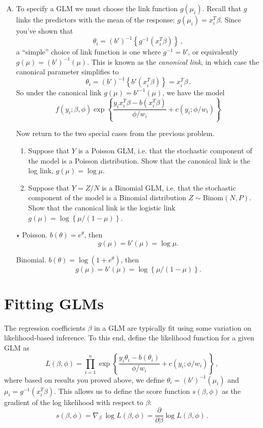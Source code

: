 \documentclass[11pt]{article}
\newcommand{\jie}{$\star$ }
\begin{document}
\begin{enumerate}[(A)]
\begin{enumerate}
\end{enumerate}




\item To specify a GLM we must choose the link function $g(\mu_i)$.  Recall that $g$ links the predictors with the mean of the response: $g(\mu_i) = x_i^T \beta$.  Since you've shown that
$$
\theta_i = (b')^{-1} \left\{g^{-1}(x_i^T \beta) \right\} \, ,
$$
a ``simple'' choice of link function is one where $g^{-1} = b'$, or equivalently $g(\mu) = (b')^{-1}(\mu)$.  This is known as the \textit{canonical link}, in which case the canonical parameter simplifies to
$$
\theta_i = (b')^{-1} \left\{b'(x_i^T \beta) \right\} = x_i^T \beta \, .
$$
So under the canonical link $g(\mu) = b'^{-1}(\mu)$, we have the model
$$
f(y_i; \beta, \phi) \exp \left\{ \frac{y_i x_i^T \beta - b(x_i^T \beta)}{\phi/w_i} + c(y_i; \phi/w_i)   \right \}
$$

Now return to the two special cases from the previous problem.
\begin{enumerate}[(1)]
\item Suppose that $Y$ is a Poisson GLM, i.e. that the stochastic component of the model is a Poisson distribution. Show that the canonical link is the log link, $g(\mu) = \log \mu$.  
\item Suppose that $Y = Z/N$ is a Binomial GLM, i.e. that the stochastic component of the model is a Binomial distribution $Z \sim \mbox{Binom}(N, P)$.   Show that the canonical link is the logistic link $g(\mu) = \log \left\{ \mu/(1-\mu) \right\}$.  
\end{enumerate}

\bigskip
\jie
Poisson. $b(\theta) = e^\theta$, then
$$g(\mu) = b'(\mu) = \log \mu.$$

Binomial. $b(\theta) = \log(1+e^\theta)$, then
$$g(\mu) = b'(\mu) = \log \left\{ \mu/(1-\mu) \right\}.$$

\end{enumerate}



\section{Fitting GLMs}

 The regression coefficients $\beta$ in a GLM are typically fit using some variation on likelihood-based inference.  To this end, define the likelihood function for a given GLM as
$$
L(\beta, \phi) = \prod_{i=1}^n \exp \left\{ \frac{y_i \theta_i - b(\theta_i)}{\phi/w_i} + c(y_i; \phi/w_i)   \right \} \, ,
$$
where based on results you proved above, we define $\theta_i = (b')^{-1}(\mu_i)$ and $\mu_i = g^{-1}(x_i^T \beta)$.  This allows us to define the score function $s(\beta, \phi)$ as the gradient of the log likelihood with respect to $\beta$:
$$
s(\beta, \phi) = \nabla_\beta \  \log L(\beta, \phi) = \frac{\partial}{\partial \beta} \log L(\beta, \phi) \, .
$$
\end{document}
